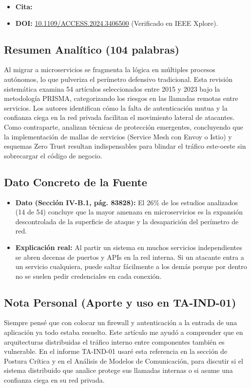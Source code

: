 \documentclass[11pt,a4paper]{article}
\begin{document}
\begin{itemize}[leftmargin=1.2em]
    \item \textbf{Cita:} 
    \item \textbf{DOI:} \href{https://doi.org/10.1109/ACCESS.2024.3406500}{10.1109/ACCESS.2024.3406500} (Verificado en IEEE Xplore).
\end{itemize}

\subsection*{Resumen Analítico (104 palabras)}
Al migrar a microservicios se fragmenta la lógica en múltiples procesos autónomos, lo que pulveriza el perímetro defensivo tradicional. Esta revisión sistemática examina 54 artículos seleccionados entre 2015 y 2023 bajo la metodología PRISMA, categorizando los riesgos en las llamadas remotas entre servicios. Los autores identifican cómo la falta de autenticación mutua y la confianza ciega en la red privada facilitan el movimiento lateral de atacantes. Como contraparte, analizan técnicas de protección emergentes, concluyendo que la implementación de mallas de servicios (Service Mesh con Envoy o Istio) y esquemas Zero Trust resultan indispensables para blindar el tráfico este-oeste sin sobrecargar el código de negocio.

\subsection*{Dato Concreto de la Fuente}
\begin{itemize}[leftmargin=1.2em]
    \item \textbf{Dato (Sección IV-B.1, pág. 83828):} El 26\% de los estudios analizados (14 de 54) concluye que la mayor amenaza en microservicios es la expansión descontrolada de la superficie de ataque y la desaparición del perímetro de red.
    \item \textbf{Explicación real:} Al partir un sistema en muchos servicios independientes se abren decenas de puertos y APIs en la red interna. Si un atacante entra a un servicio cualquiera, puede saltar fácilmente a los demás porque por dentro no se suelen pedir credenciales en cada conexión.
\end{itemize}

\subsection*{Nota Personal (Aporte y uso en TA-IND-01)}
Siempre pensé que con colocar un firewall y autenticación a la entrada de una aplicación ya todo estaba resuelto. Este artículo me ayudó a comprender que en arquitecturas distribuidas el tráfico interno entre componentes también es vulnerable. En el informe TA-IND-01 usaré esta referencia en la sección de Postura Crítica y en el Análisis de Modelos de Comunicación, para discutir si el sistema distribuido que analice protege sus llamadas internas o si asume una confianza ciega en su red privada.
\end{document}
